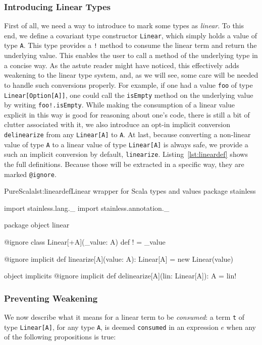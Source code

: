 \documentclass[a4paper,twoside]{article}
\newcommand{\RefCode}[1]{Listing~\ref{#1}}
\newcommand{\stt}[1]{\texttt{\small{#1}}}
\begin{document}
\subsubsection{Introducing Linear Types}

First of all, we need a way to introduce to mark some types as \textit{linear}. To this end, we define a covariant type constructor \stt{Linear}, which simply holds a value of type \stt{A}. This type provides a \stt{!} method to consume the linear term and return the underlying value. This enables the user to call a method of the underlying type in a concise way. As the astute reader might have noticed, this effectively adds weakening to the linear type system, and, as we will see, some care will be needed to handle such conversions properly. For example, if one had a value \stt{foo} of type \stt{Linear[Option[A]]}, one could call the \stt{isEmpty} method on the underlying value by writing \stt{foo!.isEmpty}. While making the consumption of a linear value explicit in this way is good for reasoning about one's code, there is still a bit of clutter associated with it, we also introduce an opt-in implicit conversion \stt{delinearize} from any \stt{Linear[A]} to \stt{A}. At last, because converting a non-linear value of type \stt{A} to a linear value of type \stt{Linear[A]} is always safe, we provide a such an implicit conversion by default, \stt{linearize}. \RefCode{lst:lineardef} shows the full definitions. Because those will be extracted in a specific way, they are marked \stt{@ignore}.

\begin{Code}{PureScala}{lst:lineardef}{Linear wrapper for Scala types and values}
package stainless

import stainless.lang._
import stainless.annotation._

package object linear {

  @ignore
  class Linear[+A](_value: A) {
    def ! = _value
  }
  
  @ignore
  implicit def linearize[A](value: A): Linear[A] = new Linear(value)
  
  object implicits {
    @ignore
    implicit def delinearize[A](lin: Linear[A]): A = lin!
  }
}
\end{Code}

\subsubsection{Preventing Weakening}

We now describe what it means for a linear term to be \textit{consumed}: a term \stt{t} of type \stt{Linear[A]}, for any type \stt{A}, is deemed \stt{consumed} in an expression $e$ when any of the following propositions is true:
\end{document}
